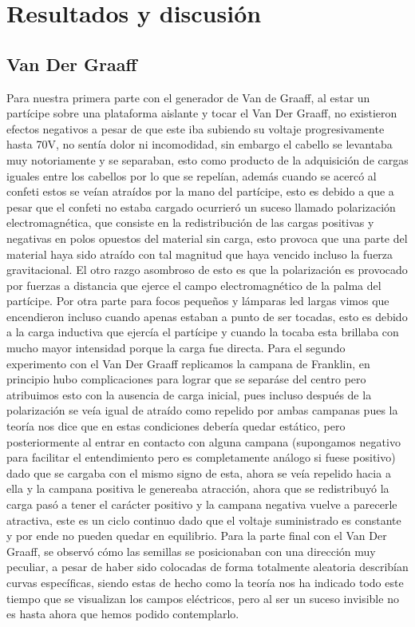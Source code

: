 \documentclass[article,12pt]{elsarticle}
\begin{document}
\section{Resultados y discusión}
\subsection{Van Der Graaff}
Para nuestra primera parte con el generador de Van de Graaff, al estar un partícipe sobre una plataforma aislante y tocar el Van Der Graaff, no existieron efectos negativos a pesar de que este iba subiendo su voltaje progresivamente hasta 70V, no sentía dolor ni incomodidad, sin embargo el cabello se levantaba muy notoriamente y se separaban, esto como producto de la adquisición de cargas iguales entre los cabellos por lo que se repelían, además cuando se acercó al confeti estos se veían atraídos por la mano del partícipe, esto es debido a que a pesar que el confeti no estaba cargado ocurrieró un suceso llamado polarización electromagnética, que consiste en la redistribución de las cargas positivas y negativas en polos opuestos del material sin carga, esto provoca que una parte del material haya sido atraído con tal magnitud que haya vencido incluso la fuerza gravitacional. El otro razgo asombroso de esto es que la polarización es provocado por fuerzas a distancia que ejerce el campo electromagnético de la palma del partícipe. 
Por otra parte para focos pequeños y lámparas led largas vimos que encendieron incluso cuando apenas estaban a punto de ser tocadas, esto es debido a la carga inductiva que ejercía el partícipe y cuando la tocaba esta brillaba con mucho mayor intensidad porque la carga fue directa. Para el segundo experimento con el Van Der Graaff replicamos la campana de Franklin, en principio hubo complicaciones para lograr que se separáse del centro pero atribuimos esto con la ausencia de carga inicial, pues incluso después de la polarización se veía igual de atraído como repelido por ambas campanas pues la teoría nos dice que en estas condiciones debería quedar estático, pero posteriormente al entrar en contacto con alguna campana (supongamos negativo para facilitar el entendimiento pero es completamente análogo si fuese positivo) dado que se cargaba con el mismo signo de esta, ahora se veía repelido hacia a ella y la campana positiva le genereaba atracción, ahora que se redistribuyó la carga pasó a tener el carácter positivo y la campana negativa vuelve a parecerle atractiva, este es un ciclo continuo dado que el voltaje suministrado es constante y por ende no pueden quedar en equilibrio.
Para la parte final con el Van Der Graaff, se observó cómo las semillas se posicionaban con una dirección muy peculiar, a pesar de haber sido colocadas de forma totalmente aleatoria describían curvas específicas, siendo estas de hecho como la teoría nos ha indicado todo este tiempo que se visualizan los campos eléctricos, pero al ser un suceso invisible no es hasta ahora que hemos podido contemplarlo.
\end{document}
